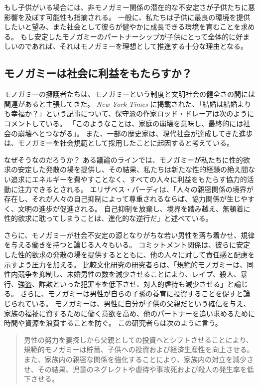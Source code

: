 \documentclass[paper=a4,book,openany]{jlreq}
\begin{document}
もし子供がいる場合には、非モノガミー関係の潜在的な不安定さが子供たちに悪影響を及ぼす可能性も指摘される。
一般に、私たちは子供に最良の環境を提供したいと望み、また社会として彼らが健やかに成長できる環境を育むことを求める。
もし安定したモノガミーのパートナーシップが子供にとって全体的に好ましいのであれば、それはモノガミーを理想として推進する十分な理由となる。

\subsection{モノガミーは社会に利益をもたらすか？}

モノガミーの擁護者たちは、モノガミーという制度と文明社会の健全さの間には関連があると主張してきた。
\emph{New York Times} に掲載された、「結婚は結婚よりも幸福か？」という記事について、保守派の作家ロッド・ドレーアは次のようにコメントしている。
「このようなことは、家庭の崩壊を意味し、最終的には社会の崩壊へとつながる」\citep{dreher17:_perver_progr}。
また、一部の歴史家は、現代社会が達成してきた進歩は、モノガミーを社会規範として採用したことに起因すると考えている。

なぜそうなのだろうか？ ある議論のラインでは、モノガミーが私たちに性的欲求の安定した発散の場を提供し、その結果、私たちは新たな性的経験の絶え間ない追求にエネルギーを費やすことなく、すべての人々に利益をもたらす協力的活動に注力できるとされる。
エリザベス・パーディは、「人々の親密関係の境界が存在し、それが人々の自己抑制によって尊重されるならば、協力関係が生じやすく、文明の進歩が促進される。
自己抑制を放棄し、境界を踏み越え、無頓着に性的欲求に耽ってしまうことは、進化的な逆行だ」と述べている\citep{pardi19:_no_human_being_arent_happier}。

さらに、モノガミーが社会不安定の源となりがちな若い男性を落ち着かせ、規律を与える働きを持つと論じる人々もいる。
コミットメント関係は、彼らに安定した性的欲求の発散の場を提供するとともに、他の人々に対して責任感と配慮を示すよう圧力を加える。
比較文化研究の研究者らは、「規範的モノガミーは、同性内競争を抑制し、未婚男性の数を減少させることにより、レイプ、殺人、暴行、強盗、詐欺といった犯罪率を低下させ、対人的虐待も減少させる」と論じる\citep[p.657]{henrich12:_puzzl_monog_marriag}。
さらに、モノガミーは男性が自らの子孫の養育に投資することを促すと論じられている。
モノガミーは、男性に自分が子供の父親だという確信を与え、家族の福祉に資するために働く意欲を高め、他のパートナーを追い求めるために時間や資源を浪費することを防ぐ。
この研究者らは次のように言う。

\begin{quote}
男性の努力を妻探しから父親としての投資へとシフトさせることにより、規範的モノガミーは貯蓄、子供への投資および経済生産性を向上させる。
また、家族内の親密な関係を強化することにより、家族内の対立を減少させ、その結果、児童のネグレクトや虐待や事故死および殺人の発生率を低下させる。
\citep[p.657]{henrich12:_puzzl_monog_marriag}
\end{quote}
\end{document}
